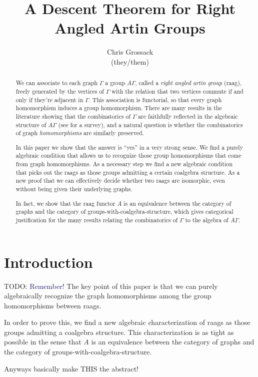 \documentclass[12pt]{article}
\author{Chris Grossack\\ (they/them)}
\title{A Descent Theorem for Right Angled Artin Groups}
\theoremstyle{definition}
\theoremstyle{theorem}
\newcommand*{\important}[1]{\textcolor{MidnightBlue}{#1}}
\begin{document}
\maketitle

\begin{abstract}
  We can associate to each graph $\Gamma$ a group $A\Gamma$, called a
  \emph{right angled artin group} (raag), freely generated by the vertices
  of $\Gamma$ with the relation that two vertices commute if and only if 
  they're adjacent in $\Gamma$. This association is functorial, so that 
  every graph homomorphism induces a group homomorphism. 
  There are many results in the literature showing that the combinatorics 
  of $\Gamma$ are faithfully reflected in the algebraic structure of $A \Gamma$
  (see \cite{koberdaGeometryCombinatoricsRightAngled2022} for a survey),
  and a natural question is whether the combinatorics of graph \emph{homomorphisms}
  are similarly preserved.

  In this paper we show that the answer is ``yes'' in a very strong sense. 
  We find a purely algebraic condition that allows us to recognize those 
  group homomorphisms that come from graph homomorphisms. As a necessary 
  step we find a new algebraic condition that picks out the raags as 
  those groups admitting a certain coalgebra structure. As a new proof that 
  we can effectively decide whether two raags are isomorphic, even without 
  being given their underlying graphs.    

  In fact, we show that the raag functor $A$ is an equivalence between 
  the category of graphs and the category of groups-with-coalgebra-structure,
  which gives categorical justification for the many results 
  relating the combinatorics of $\Gamma$ to the algebra of $A \Gamma$.
\end{abstract}

\newpage
\section{Introduction}
\label{intro}

  \begin{mdframed}
  TODO: \important{Remember!} The key point of this paper is that we can 
  purely algebraically recognize the graph homomorphisms among the group 
  homomorphisms between raags. 

  In order to prove this, we find a new algebraic characterization of 
  raags as those groups admitting a coalgebra structure. This characterization
  is as tight as possible in the sense that $A$ is an equivalence between
  the category of graphs and the category of groups-with-coalgebra-structure.

    Anyways basically make THIS the abstract!
  \end{mdframed}
\end{document}

